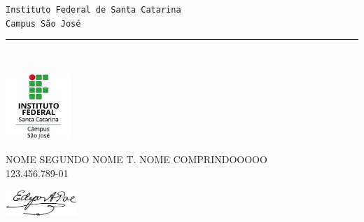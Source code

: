 \documentclass[11pt,a4paper]{memoir}
\begin{document}
    \begin{Spacing}{0.75}%
    \noindent
    \texttt{\fontsize{4mm}{5mm}\selectfont Instituto Federal de Santa Catarina}\\
    \texttt{\fontsize{3mm}{4mm}\selectfont Campus São José }\\ 
    \rule{74mm}{.3mm}\\
    \begin{minipage}[t]{33mm}
        \vspace{-0mm}%
        \hspace{-5mm}\includegraphics[height=25mm]{logo-ifsc-saojose.png}
    \end{minipage}
    \hspace{1mm}
    \begin{minipage}[t]{42mm}
        \vspace{-0mm}%
        \begin{flushleft}
        {\scriptsize
            \begin{Spacing}{1}%
            \vspace{6mm}
             NOME SEGUNDO NOME T. NOME COMPRINDOOOOO
\\
             \hspace{1mm} 123.456.789-01\\
            \end{Spacing}
        }
    \begin{minipage}[t]{33mm}
        \vspace{-0mm}%
        \includegraphics[height=10mm]{assinatura.png}
    \end{minipage}
        \end{flushleft}
    \end{minipage}
    \end{Spacing}
\end{document}
